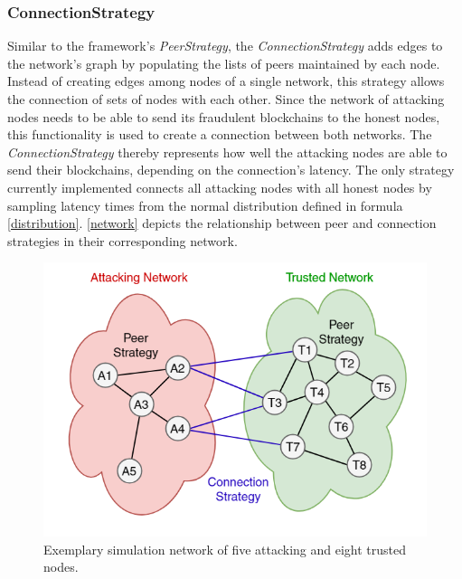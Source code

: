 \documentclass[a4paper,12pt,twoside]{report}
\begin{document}
\subsubsection{ConnectionStrategy} \label{connstrat}
Similar to the framework's \textit{PeerStrategy}, the \textit{ConnectionStrategy} adds edges to the network's graph by populating the lists of peers maintained by each node. Instead of creating edges among nodes of a single network, this strategy allows the connection of sets of nodes with each other. Since the network of attacking nodes needs to be able to send its fraudulent blockchains to the honest nodes, this functionality is used to create a connection between both networks. The \textit{ConnectionStrategy} thereby represents how well the attacking nodes are able to send their blockchains, depending on the connection's latency. The only strategy currently implemented connects all attacking nodes with all honest nodes by sampling latency times from the normal distribution defined in formula \ref{distribution}. \autoref{network} depicts the relationship between peer and connection strategies in their corresponding network.
\begin{figure}[ht]
	\centering
  \includegraphics[width=\textwidth]{Network.png}
	\caption{Exemplary simulation network of five attacking and eight trusted nodes.}
	\label{network}
\end{figure}
\end{document}
